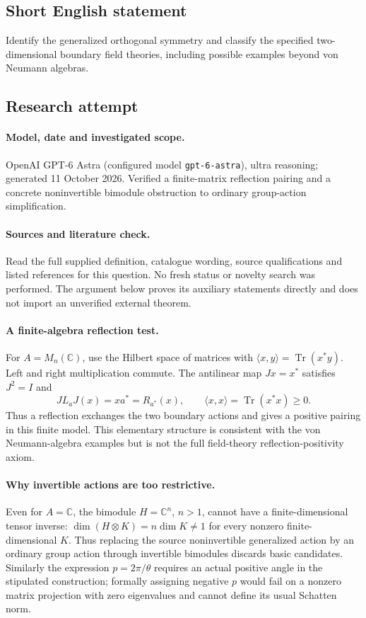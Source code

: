 \documentclass[11pt]{article}
\begin{document}
\subsection{Short English statement}
Identify the generalized orthogonal symmetry and classify the specified two-dimensional boundary field theories, including possible examples beyond von Neumann algebras.
\subsection{Research attempt}
\paragraph{Model, date and investigated scope.}
OpenAI GPT-6 Astra (configured model \texttt{gpt-6-astra}), ultra reasoning; generated 11 October 2026. Verified a finite-matrix reflection pairing and a concrete noninvertible bimodule obstruction to ordinary group-action simplification.

\paragraph{Sources and literature check.}
Read the full supplied definition, catalogue wording, source qualifications and listed references for this question. No fresh status or novelty search was performed. The argument below proves its auxiliary statements directly and does not import an unverified external theorem.

\paragraph{A finite-algebra reflection test.} For \(A=M_n(\mathbb C)\), use the Hilbert space of matrices with \(\langle x,y\rangle=\operatorname{Tr}(x^*y)\). Left and right multiplication commute. The antilinear map \(Jx=x^*\) satisfies \(J^2=I\) and
\[
 J L_a J(x)=xa^*=R_{a^*}(x),\qquad
 \langle x,x\rangle=\operatorname{Tr}(x^*x)\geq0.
\]
Thus a reflection exchanges the two boundary actions and gives a positive pairing in this finite model. This elementary structure is consistent with the von Neumann-algebra examples but is not the full field-theory reflection-positivity axiom.
\paragraph{Why invertible actions are too restrictive.} Even for \(A=\mathbb C\), the bimodule \(H=\mathbb C^n\), \(n>1\), cannot have a finite-dimensional tensor inverse: \(\dim(H\otimes K)=n\dim K\ne1\) for every nonzero finite-dimensional \(K\). Thus replacing the source noninvertible generalized action by an ordinary group action through invertible bimodules discards basic candidates. Similarly the expression \(p=2\pi/\theta\) requires an actual positive angle in the stipulated construction; formally assigning negative \(p\) would fail on a nonzero matrix projection with zero eigenvalues and cannot define its usual Schatten norm.
\end{document}
